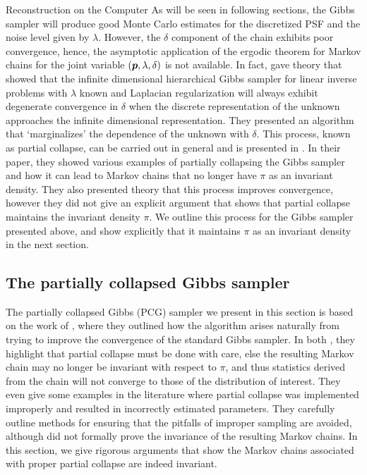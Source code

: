 \begin{chapter}{Reconstruction on the Computer}
As will be seen in following sections, the Gibbs sampler will produce good Monte Carlo estimates for the discretized PSF and the noise level given by $\lambda$. 
However, the $\delta$ component of the chain exhibits poor convergence, hence, the asymptotic application of the ergodic theorem for Markov chains for the joint variable $(\mbox{\boldmath$p$},\lambda,\delta)$ is not available.
In fact, \citep{agapiou2014analysis} gave theory that showed that the infinite dimensional hierarchical Gibbs sampler for linear inverse problems with $\lambda$ known and Laplacian regularization will always exhibit degenerate convergence in $\delta$ when the discrete representation of the unknown approaches the infinite dimensional representation.
They presented an algorithm that `marginalizes' the dependence of the unknown with $\delta$.
This process, known as partial collapse, can be carried out in general and is presented in \citep{van2008partially}.
In their paper, they showed various examples of partially collapsing the Gibbs sampler and how it can lead to Markov chains that no longer have $\pi$ as an invariant density.
They also presented theory that this process improves convergence, however they did not give an explicit argument that shows that partial collapse maintains the invariant density $\pi$.
We outline this process for the Gibbs sampler presented above, and show explicitly that it maintains $\pi$ as an invariant density in the next section.

\subsection{The partially collapsed Gibbs sampler}
The partially collapsed Gibbs (PCG) sampler we present in this section is based on the work of \citep{van2008partially,van2015metropolis}, where they outlined how the algorithm arises naturally from trying to improve the convergence of the standard Gibbs sampler.
In both \citep{van2008partially,van2015metropolis}, they highlight that partial collapse must be done with care, else the resulting Markov chain may no longer be invariant with respect to $\pi$, and thus statistics derived from the chain will not converge to those of the distribution of interest.
They even give some examples in the literature where partial collapse was implemented improperly and resulted in incorrectly estimated parameters.
They carefully outline methods for ensuring that the pitfalls of improper sampling are avoided, although did not formally prove the invariance of the resulting Markov chains.
In this section, we give rigorous arguments that show the Markov chains associated with proper partial collapse are indeed invariant.


\end{chapter}

